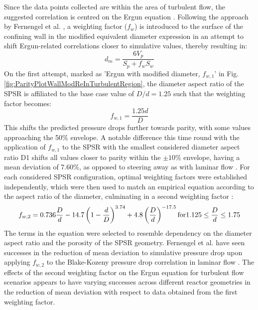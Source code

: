 Since the data points collected are within the area of turbulent flow, the suggested correlation is centred on the Ergun equation \cite{Ergun1952}.
Following the approach by Fernengel et al. \cite{Fernengel2020}, a weighting factor ($f_w$) is introduced to the surface of the confining wall in the modified equivalent diameter expression in an attempt to shift Ergun-related correlations closer to simulative values, thereby resulting in:
\begin{equation}\label{eqn:d_mWithweightingFactor}
d_m = \frac{6 V_p}{S_p + f_wS_w}
\end{equation}
On the first attempt, marked as 'Ergun with modified diameter, $f_{w,1}$' in Fig. \ref{fig:ParityPlotWallModReInTurbulentRegion}, the diameter aspect ratio of the SPSR is affiliated to the base case value of $D/d = 1.25$ such that the weighting factor becomes:
\begin{equation}\label{eqn:f_w,1}
f_{w,1} = \frac{1.25d}{D}
\end{equation}
This shifts the predicted pressure drops further towards parity, with some values approaching the 50\% envelope. A notable difference this time round with the application of $f_{w,1}$ to the SPSR with the smallest considered diameter aspect ratio D1 shifts all values closer to parity within the $\pm10\%$ envelope, having a mean deviation of 7.60\%, as opposed to steering away as with laminar flow \cite{Fernengel2020}.
For each considered SPSR configuration, optimal weighting factors were established independently, which were then used to match an empirical equation according to the aspect ratio of the diameter, culminating in a second weighting factor \cite{Fernengel2020}:
\begin{equation}\label{eqn:f_w,2}
f_{w,2} = 0.736\frac{D}{d}-14.7\left(1-\frac{d}{D}\right)^{3.74}+4.8\left(\frac{D}{d}\right)^{-17.5}
\\\text{for} 1.125\leq\frac{D}{d}\leq1.75
\end{equation}
The terms in the equation were selected to resemble dependency on the diameter aspect ratio and the porosity of the SPSR geometry. Fernengel et al. have seen successes in the reduction of mean deviation to simulative pressure drop upon applying $f_{w,2}$ to the Blake-Kozeny pressure drop correlation in laminar flow \cite{Fernengel2020}. The effects of the second weighting factor on the Ergun equation for turbulent flow scenarios appears to have varying successes across different reactor geometries in the reduction of mean deviation with respect to data obtained from the first weighting factor.

